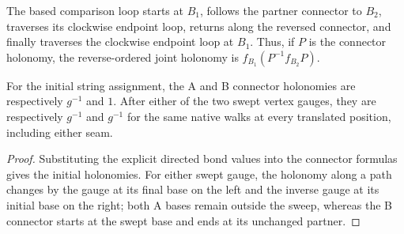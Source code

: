 \begin{definition}
    \label{def:peps_torus_swept_patch_B_joint_loop}
    \leanok
    The based comparison loop starts at $B_1$, follows the partner connector to
    $B_2$, traverses its clockwise endpoint loop, returns along the reversed
    connector, and finally traverses the clockwise endpoint loop at $B_1$.
    Thus, if $P$ is the connector holonomy, the reverse-ordered joint
    holonomy is $f_{B_1}(P^{-1}f_{B_2}P)$.
\end{definition}

\begin{lemma}
    \label{thm:peps_torus_swept_patch_partner_transports}
    \leanok
    For the initial string assignment, the A and B connector
    holonomies are respectively $g^{-1}$ and $1$.
    After either of the two swept vertex gauges, they are respectively
    $g^{-1}$ and $g^{-1}$ for the same native walks at every translated
    position, including either seam.
\end{lemma}
\begin{proof}\leanok
    Substituting the explicit directed bond values into the connector formulas
    gives the initial holonomies. For either swept gauge, the holonomy along a
    path changes by the gauge at its final base on the left and the inverse
    gauge at its initial base on the right; both A bases remain outside the
    sweep, whereas the B connector starts at the swept base and ends at its
    unchanged partner.
\end{proof}

